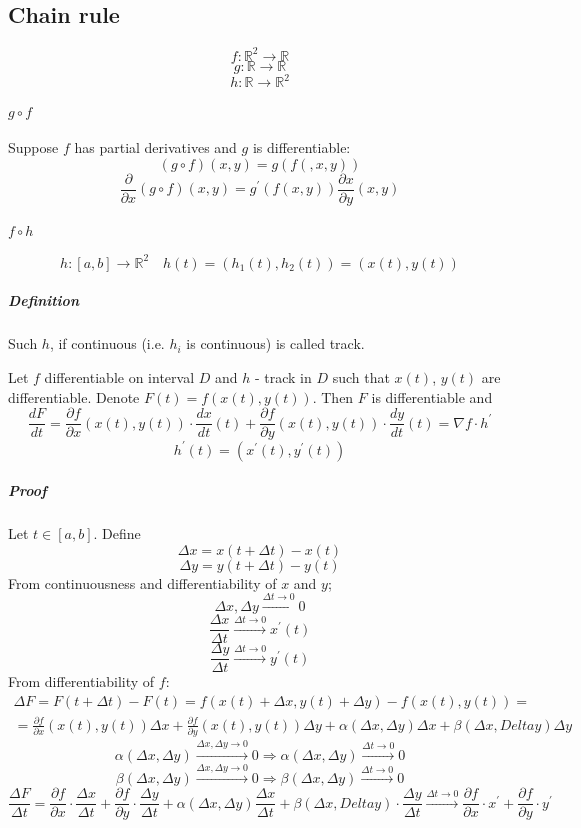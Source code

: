 \subsection{Chain rule}
$$f: \mathbb{R}^2 \to \mathbb{R}$$
$$g: \mathbb{R} \to \mathbb{R}$$
$$h: \mathbb{R} \to \mathbb{R}^2$$

\paragraph{$g \circ f$} Suppose $f$ has partial derivatives and $g$ is differentiable:
$$(g\circ f)(x,y) = g(f(,x,y))$$ 
$$\frac{\partial}{\partial x} (g\circ f)(x,y) = g^\prime (f(x,y)) \frac{\partial x}{\partial y}(x,y)$$
\paragraph{$f \circ h$} 
$$h:[a,b]\to \mathbb{R}^2 \quad h(t) = \left(h_1(t), h_2(t)\right) = \left(x(t), y(t)\right)$$
\subparagraph{Definition} Such $h$, if continuous (i.e. $h_i$ is continuous) is called track.

Let $f$ differentiable on interval $D$ and $h$ - track in $D$ such that $x(t)$, $y(t)$ are differentiable. Denote $F(t) = f(x(t), y(t))$. Then $F$ is differentiable and 
$$\frac{dF}{dt}= \frac{\partial f}{\partial x}(x(t), y(t)) \cdot \frac{dx}{dt}(t) + \frac{\partial f}{\partial y}(x(t), y(t)) \cdot \frac{dy}{dt}(t) = \nabla f \cdot h^\prime$$
$$h^\prime (t) = \left(x^\prime(t), y^\prime(t)\right)$$
\subparagraph{Proof}
Let $t\in [a,b]$. Define 
$$\Delta x = x\left(t+\Delta t\right) - x(t)$$ 
$$\Delta y = y\left(t+\Delta t\right) - y(t)$$ 
From continuousness and differentiability of $x$ and $y$;
$$\Delta x, \Delta y \stackrel{\Delta t \to 0}{\to} 0$$
$$\frac{\Delta x}{\Delta t} \stackrel{\Delta t \to 0}{\to} x^\prime(t)$$ 
$$\frac{\Delta y}{\Delta t} \stackrel{\Delta t \to 0}{\to} y^\prime(t)$$ 
From differentiability of $f$:
\begin{align*}
\Delta F = F(t+\Delta t) - F(t) = f(x(t)+\Delta x, y(t)+\Delta y) - f(x(t),y(t)) =\\= \frac{\partial f}{\partial x}(x(t), y(t)) \Delta x+\frac{\partial f}{\partial y}(x(t), y(t)) \Delta y + \alpha (\Delta x, \Delta y)\Delta x + \beta (\Delta x, Delta y)\Delta y\end{align*}
$$\alpha (\Delta x, \Delta y) \stackrel{\Delta x, \Delta y \to 0}{\to} 0 \Rightarrow \alpha (\Delta x, \Delta y) \stackrel{\Delta t \to 0}{\to} 0$$
$$\beta (\Delta x, \Delta y) \stackrel{\Delta x, \Delta y \to 0}{\to} 0 \Rightarrow \beta (\Delta x, \Delta y) \stackrel{\Delta t \to 0}{\to} 0$$
$$\frac{\Delta F}{\Delta t} = \frac{\partial f}{\partial x} \cdot \frac{\Delta x}{\Delta t}+\frac{\partial f}{\partial y} \cdot \frac{\Delta y}{\Delta t} + \alpha (\Delta x, \Delta y)\frac{\Delta x}{\Delta t} + \beta (\Delta x, Delta y)\cdot \frac{\Delta y}{\Delta t}\stackrel{\Delta t \to 0}{\to} \frac{\partial f}{\partial x} \cdot x^\prime +\frac{\partial f}{\partial y} \cdot y^\prime $$
